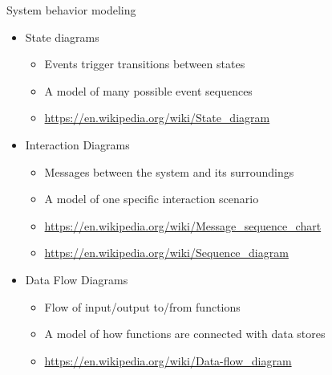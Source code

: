 \begin{Slide}{System behavior modeling}

\begin{itemize}
\item State diagrams
\begin{itemize}
\item Events trigger transitions between states
\item A model of many possible event sequences
\item {\footnotesize\url{https://en.wikipedia.org/wiki/State_diagram}}

\end{itemize}
\item Interaction Diagrams
\begin{itemize}
\item Messages between the system and its surroundings
\item A model of one specific interaction scenario
\item {\footnotesize\url{https://en.wikipedia.org/wiki/Message_sequence_chart}}
\item {\footnotesize\url{https://en.wikipedia.org/wiki/Sequence_diagram}}

\end{itemize}
\item Data Flow Diagrams
\begin{itemize}
\item Flow of input/output to/from functions
\item A model of how functions are connected with data stores
\item {\footnotesize\url{https://en.wikipedia.org/wiki/Data-flow_diagram}}

\end{itemize}
\end{itemize}
\end{Slide}